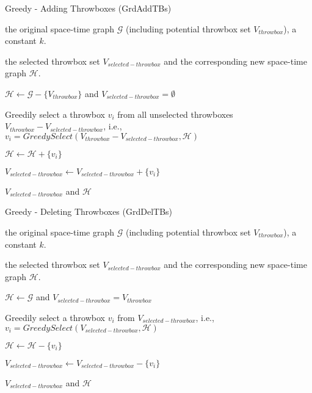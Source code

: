 \documentclass[10pt,conference,compsocconf,letterpaper]{IEEEtran}
\begin{document}
\begin{algorithm}[t]
\renewcommand{\algorithmicrequire}{\textbf{Input:}}
\renewcommand\algorithmicensure {\textbf{Output:}}
\caption{Greedy - Adding Throwboxes (GrdAddTBs)}
\label{alg:GreedyAdd}

\begin{algorithmic}[1]

\REQUIRE the original space-time graph $\mathcal{G}$ (including potential throwbox set $V_{throwbox}$), a constant $k$.

\ENSURE  the selected throwbox set $V_{selected-throwbox}$ and the corresponding new space-time graph $\mathcal{H}$.

\STATE $\mathcal{H}  \leftarrow \mathcal{G}-\{V_{throwbox}\}$ and $V_{selected-throwbox}=\emptyset$


\STATE Greedily select a throwbox $v_i$ from all unselected throwboxes $V_{throwbox}-V_{selected-throwbox}$, i.e., $v_i=GreedySelect(V_{throwbox}-V_{selected-throwbox},\mathcal{H})$

\STATE $\mathcal{H}\leftarrow \mathcal{H} +\{ v_i\}$

\STATE $V_{selected-throwbox} \leftarrow V_{selected-throwbox} + \{ v_i\}$

\ENDWHILE

\RETURN $V_{selected-throwbox}$ and $\mathcal{H}$

\end{algorithmic}
\end{algorithm}

\begin{algorithm}[t]
\renewcommand{\algorithmicrequire}{\textbf{Input:}}
\renewcommand\algorithmicensure {\textbf{Output:}}
\caption{Greedy - Deleting Throwboxes (GrdDelTBs)}
\label{alg:GreedyDel}

\begin{algorithmic}[1]

\REQUIRE the original space-time graph $\mathcal{G}$ (including potential throwbox set $V_{throwbox}$), a constant $k$.

\ENSURE  the selected throwbox set $V_{selected-throwbox}$ and the corresponding new space-time graph $\mathcal{H}$.

\STATE $\mathcal{H}  \leftarrow \mathcal{G}$ and $V_{selected-throwbox}=V_{throwbox}$


\STATE Greedily select a throwbox $v_i$ from $V_{selected-throwbox}$, i.e., $v_i=GreedySelect(V_{selected-throwbox},\mathcal{H})$

\STATE $\mathcal{H}\leftarrow \mathcal{H} - \{ v_i\}$

\STATE $V_{selected-throwbox} \leftarrow V_{selected-throwbox} - \{ v_i\}$

\ENDWHILE

\RETURN $V_{selected-throwbox}$ and $\mathcal{H}$

\end{algorithmic}
\end{algorithm}
\end{document}

